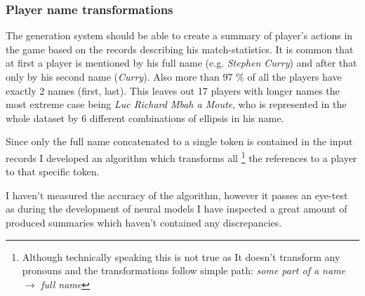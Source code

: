 \subsubsection{Player name transformations} \label{player_nm_trans_summary}

The generation system should be able to create a summary of player's actions in the game based on the records describing his match-statistics. It is common that at first a player is mentioned by his full name (e.g. \emph{Stephen Curry}) and after that only by his second name (\emph{Curry}). Also more than 97 \% of all the players have exactly 2 names (first, last). This leaves out 17 players with longer names the most extreme case being \emph{Luc Richard Mbah a Moute}, who is represented in the whole dataset by 6 different combinations of ellipsis in his name.

Since only the full name concatenated to a single token is contained in the input records I developed an algorithm which transforms all \footnote{Although technically speaking this is not true as It doesn't transform any pronouns and the transformations follow simple path: \emph{some part of a name} $\rightarrow$ \emph{full name}} the references to a player to that specific token.

I haven't measured the accuracy of the algorithm, however it passes an eye-test as during the development of neural models I have inspected a great amount of produced summaries which haven't contained any discrepancies.

